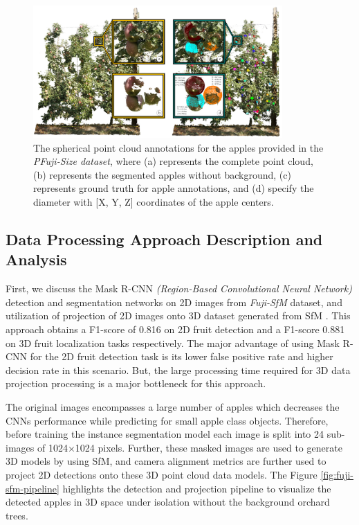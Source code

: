 \documentclass{article}
\begin{document}
\begin{figure}[h]
    \centering
    \includegraphics[width=0.85\textwidth]{pfuji-size-dataset.png}
    \caption{The spherical point cloud annotations for the apples provided in the \textit{PFuji-Size dataset}, where (a) represents the complete point cloud, (b) represents the segmented apples without background, (c) represents ground truth for apple annotations, and (d) specify the diameter with [X, Y, Z] coordinates of the apple centers.}
    \label{fig:fuji-size}
\end{figure}


\subsection{Data Processing Approach Description and Analysis}


First, we discuss the Mask R-CNN \textit{(Region-Based Convolutional Neural Network)} detection and segmentation networks on 2D images from \textit{Fuji-SfM} dataset, and utilization of projection of 2D images onto 3D dataset generated from SfM \cite{he2017mask, gene2020fruit}.
This approach obtains a F1-score of 0.816 on 2D fruit detection and a F1-score 0.881 on 3D fruit localization tasks respectively.
The major advantage of using Mask R-CNN for the 2D fruit detection task is its lower false positive rate and higher decision rate in this scenario.
But, the large processing time required for 3D data projection processing is a major bottleneck for this approach.


The original images encompasses a large number of apples which decreases the CNNs performance while predicting for small apple class objects.
Therefore, before training the instance segmentation model each image is split into 24 sub-images of 1024$\times$1024 pixels.
Further, these masked images are used to generate 3D models by using SfM, and camera alignment metrics are further used to project 2D detections onto these 3D point cloud data models. 
The Figure \ref{fig:fuji-sfm-pipeline} highlights the detection and projection pipeline to visualize the detected apples in 3D space under isolation without the background orchard trees.
\end{document}
